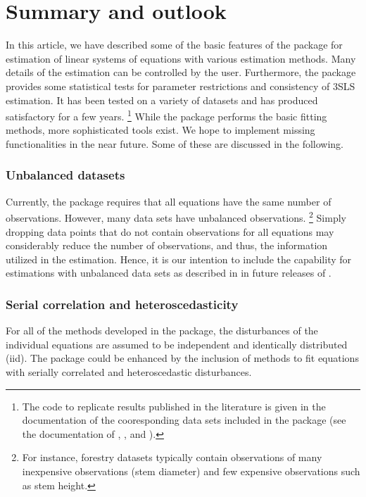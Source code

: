 

\section{Summary and outlook}\label{sec:Summmary}

In this article, we have described some of the basic features of the
 package for estimation of linear systems of
equations with various estimation methods.
Many details of the estimation can be controlled by the user.
Furthermore, the package provides some statistical tests
for parameter restrictions and consistency of 3SLS estimation.
It has been tested on a variety of datasets and has produced satisfactory
for a few years.%
\footnote{
The code to replicate results published in the literature is given
in the documentation of the cooresponding data sets
included in the  package
(see the documentation of , ,
 and ).
}
While the  package performs the basic fitting methods,
more sophisticated tools exist.
We hope to implement missing functionalities
in the near future.
Some of these are discussed in the following.

\subsubsection*{Unbalanced datasets}
Currently, the  package requires
that all equations have the same number of observations.
However, many data sets have unbalanced observations.%
\footnote{
For instance,
forestry datasets typically contain observations of many inexpensive
observations (stem diameter) and few expensive observations such
as stem height.
}
Simply dropping data points
that do not contain observations for all equations
may considerably reduce the number of observations,
and thus, the information utilized in the estimation.
Hence, it is our intention to include the capability for estimations
with unbalanced data sets as described in \citet{schmidt77}
in future releases of .

\subsubsection*{Serial correlation and heteroscedasticity}
For all of the methods developed in the package, the disturbances of
the individual equations are assumed to be independent and identically
distributed (iid).
The package could be enhanced by the inclusion of methods to fit
equations with serially correlated and heteroscedastic disturbances.

